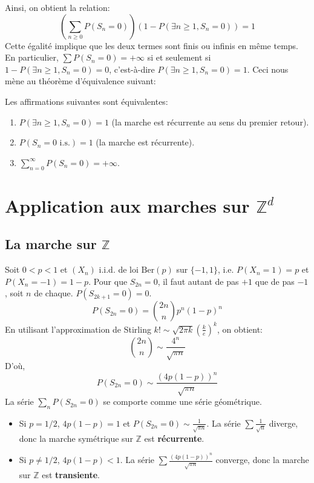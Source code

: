 Ainsi, on obtient la relation:
\begin{equation*}
    \left(\sum_{n \ge 0} P(S_n=0)\right) \left(1 - P(\exists n \ge 1, S_n=0)\right) = 1
\end{equation*}
Cette égalité implique que les deux termes sont finis ou infinis en même temps. En particulier, $\sum P(S_n=0) = +\infty$ si et seulement si $1 - P(\exists n \ge 1, S_n=0) = 0$, c'est-à-dire $P(\exists n \ge 1, S_n=0) = 1$.
Ceci nous mène au théorème d'équivalence suivant:
\begin{theorem}
Les affirmations suivantes sont équivalentes:
\begin{enumerate}
    \item $P(\exists n \ge 1, S_n=0) = 1$ (la marche est récurrente au sens du premier retour).
    \item $P(S_n=0 \text{ i.s.}) = 1$ (la marche est récurrente).
    \item $\sum_{n=0}^{\infty} P(S_n=0) = +\infty$.
\end{enumerate}
\end{theorem}
\section{Application aux marches sur $\mathbb{Z}^d$}
\subsection{La marche sur $\mathbb{Z}$}
Soit $0<p<1$ et $(X_n)$ i.i.d. de loi $\text{Ber}(p)$ sur $\{-1, 1\}$, i.e. $P(X_n=1)=p$ et $P(X_n=-1)=1-p$.
Pour que $S_{2n}=0$, il faut autant de pas $+1$ que de pas $-1$, soit $n$ de chaque. $P(S_{2k+1}=0)=0$.
\begin{equation*}
    P(S_{2n}=0) = \binom{2n}{n} p^n (1-p)^n
\end{equation*}
En utilisant l'approximation de Stirling $k! \sim \sqrt{2\pi k} (\frac{k}{e})^k$, on obtient:
\begin{equation*}
    \binom{2n}{n} \sim \frac{4^n}{\sqrt{\pi n}}
\end{equation*}
D'où,
\begin{equation*}
    P(S_{2n}=0) \sim \frac{(4p(1-p))^n}{\sqrt{\pi n}}
\end{equation*}
La série $\sum_n P(S_{2n}=0)$ se comporte comme une série géométrique.
\begin{itemize}
    \item Si $p=1/2$, $4p(1-p)=1$ et $P(S_{2n}=0) \sim \frac{1}{\sqrt{\pi n}}$. La série $\sum \frac{1}{\sqrt{n}}$ diverge, donc la marche symétrique sur $\mathbb{Z}$ est \textbf{récurrente}.
    \item Si $p \neq 1/2$, $4p(1-p)<1$. La série $\sum \frac{(4p(1-p))^n}{\sqrt{\pi n}}$ converge, donc la marche sur $\mathbb{Z}$ est \textbf{transiente}.
\end{itemize}
